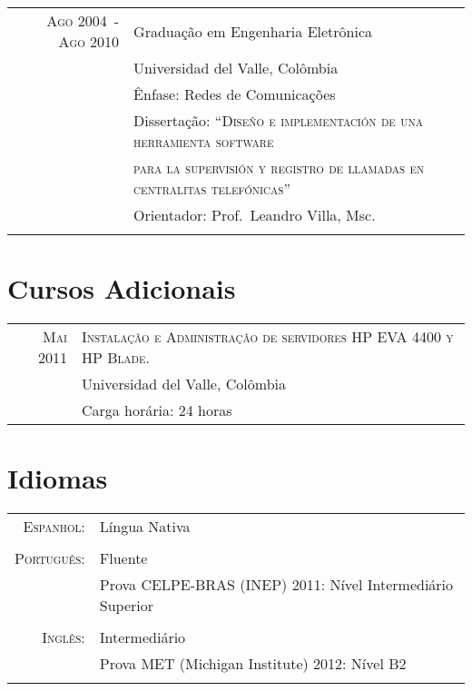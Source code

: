 \documentclass[a4paper,10pt]{article}
\begin{document}
\begin{tabular}{rl}
    \textsc{Ago 2004~-~Ago 2010}    & Graduação em Engenharia Eletrônica\\
                                    & Universidad del Valle, Colômbia \\
                                    & Ênfase: Redes de Comunicações \\
                                    & Dissertação: ``\textsc{Diseño e implementación de una herramienta software} \\
                                    & \textsc{para la supervisión y registro de llamadas en centralitas telefónicas}'' \\
                                    & Orientador: Prof.~Leandro Villa, Msc. \\
                                    &\\

\end{tabular}

\section{Cursos Adicionais}
\begin{tabular}{rl}	

  \textsc{Mai 2011} & \textsc{Instalação e Administração de servidores HP EVA 4400 y HP Blade.} \\
                    & Universidad del Valle, Colômbia \\
                    & Carga horária: 24 horas \\

\end{tabular}

\section{Idiomas}
\begin{tabular}{rl}

    \textsc{Espanhol:}      & Língua Nativa\\
                            &\\

    \textsc{Português:}     & Fluente\\
                            & Prova \textsc{CELPE-BRAS} (INEP) 2011: Nível Intermediário Superior\\
                            &\\

    \textsc{Inglês:}        & Intermediário\\
                            & Prova \textsc{MET} (Michigan Institute) 2012: Nível B2 \\
                            &\\

\end{tabular}
\end{document}
